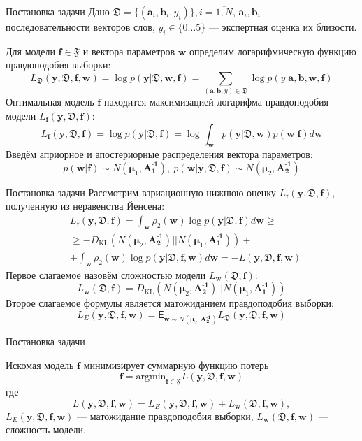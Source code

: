 \documentclass{beamer}
\newcommand{\PP}{p}
\newcommand{\DD}{{\mathfrak{D}}}
\newcommand{\FFF}{{\mathfrak{F}}}
\newcommand{\bw}{{\textbf{w}}}
\newcommand{\ba}{{\textbf{a}}}
\newcommand{\bb}{{\textbf{b}}}
\newcommand{\bbf}{{\textbf{f}}}
\newcommand{\by}{{\textbf{y}}}
\newcommand{\bAo}{\mathbf{A^\text{-1}_\text{1}}}
\newcommand{\bAt}{\mathbf{A^\text{-1}_\text{2}}}
\newcommand{\bmuo}{{\boldsymbol{\mu}_1}}
\newcommand{\bmut}{{\boldsymbol{\mu}_2}}
\newcommand{\DKL}{\mathit{D}_{\text{KL}}}
\begin{document}
\begin{frame}{Постановка задачи}
Дано $\DD = \{(\ba_i,\bb_i,y_i)\}, i = \overline{1,N}$,
$\ba_i, \bb_i$ --- последовательности векторов слов, $y_i \in \{0\dots5\}$ --- экспертная оценка их близости. 

Для модели $\bbf \in \FFF$ и вектора параметров $\bw$ определим логарифмическую функцию правдоподобия выборки:
$$L_\DD(\by,\DD, \bbf,\bw) = \log\PP(\by|\DD,\bw,\bbf) = \sum_{(\ba,\bb,y)\in\DD} \log\PP(y|\ba,\bb,\bw,\bbf)$$
Оптимальная модель $\bbf$ находится максимизацией логарифма правдоподобия модели $L_\bbf(\by,\DD,\bbf)$:
$$L_\bbf(\by,\DD,\bbf) = \log \PP(\by|\DD,\bbf) = \log \int_{\bw}\PP(\by|\DD,\bw)\PP(\bw|\bbf)d\bw$$
Введём априорное и апостериорные распределения вектора параметров:
$$\PP(\bw|\bbf) \sim N(\bmuo,\bAo), \ \PP(\bw|\by,\DD,\bbf) \sim N(\bmut,\bAt)$$

\end{frame}

\begin{frame}{Постановка задачи}
Рассмотрим вариационную нижнюю оценку $L_\bbf(\by,\DD,\bbf)$, полученную из неравенства Йенсена:
\begin{align*}
&L_\bbf(\by,\DD,\bbf)= \int_{\bw}\rho_2(\bw)\log\PP(\by|\DD,\bbf)d\bw \geq\\&\geq-\DKL(N(\bmut,\bAt)||N(\bmuo,\bAo))+\\
&+ \int_{\bw}\rho_2(\bw)\log\PP(\by|\DD,\bbf,\bw)d\bw = -L(\by,\DD,\bbf,\bw)
\end{align*}
Первое слагаемое назовём сложностью модели $L_\bw(\DD,\bbf)$:
$$L_\bw(\DD,\bbf) = \DKL(N(\bmut,\bAt)||N(\bmuo,\bAo)) $$
Второе слагаемое формулы является матожиданием правдоподобия выборки:
$$L_E(\by,\DD,\bbf,\bw) = \mathsf{E}_{\bw\sim N(\bmut,\bAt)}L_\DD(\by,\DD, \bbf,\bw) $$

\end{frame}

\begin{frame}{Постановка задачи}
	
Искомая модель $\bbf$ минимизирует суммарную функцию потерь
$$\bbf = \text{argmin}_{\bbf \in \FFF}L(\by,\DD,\bbf,\bw)$$
где 
$$L(\by,\DD,\bbf,\bw) = L_E(\by,\DD,\bbf,\bw) + L_\bw(\DD,\bbf,\bw),$$
$L_E(\by,\DD,\bbf,\bw)$ --- матожидание правдоподобия выборки, $L_\bw(\DD,\bbf,\bw)$ --- сложность модели.

\end{frame}
\end{document}
